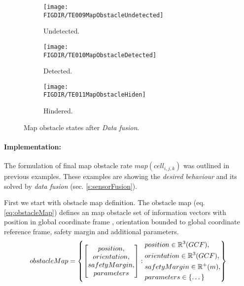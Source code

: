 \begin{figure}[H]
    \begin{subfigure}{0.32\textwidth}
        \texttt{[image: \\FIGDIR/TE009MapObstacleUndetected]} 
        \caption{Undetected.}
        \label{fig:undetectedMapObstalce}
    \end{subfigure}
    \begin{subfigure}{0.32\textwidth}
        \texttt{[image: \\FIGDIR/TE010MapObstacleDetected]} 
        \caption{Detected.}
        \label{fig:detectedMapObstacle}
    \end{subfigure}
    \begin{subfigure}{0.32\textwidth}
        \texttt{[image: \\FIGDIR/TE011MapObstacleHiden]}
        \caption{Hindered.}
        \label{fig:hinderedMapObstacle}
    \end{subfigure}
    \caption{Map obstacle states after \emph{Data fusion}.}
    \label{fig:mapObstacleStatesAfterDataFusion}
\end{figure}

\paragraph{Implementation:} The formulation of final map obstacle rate  $map(cell_{i,j,k})$ was outlined in previous examples. These examples are showing the \emph{desired behaviour} and its solved by \emph{data fusion} (sec. \ref{s:sensorFusion}).

First we start with obstacle map definition. The obstacle map  (eq. \ref{eq:obstacleMap}) defines an map obstacle set of information vectors with position in global coordinate frame , orientation bounded to global coordinate reference frame, safety margin and additional parameters.
\begin{equation}\label{eq:obstacleMap}
    obstacle Map= 
    \left\{
    \begin{bmatrix}
        position,\\
        orientation,\\
        safety Margin,\\
        parameters
    \end{bmatrix}
    :
    \begin{aligned}
        & position \in  \mathbb{R}^3(GCF),\\
        & orientation \in \mathbb{R}^3(GCF),\\
        & safety Margin \in \mathbb{R}^+(m),\\
        & parameters \in \{\dots\}
    \end{aligned}
    \right\}
\end{equation}


